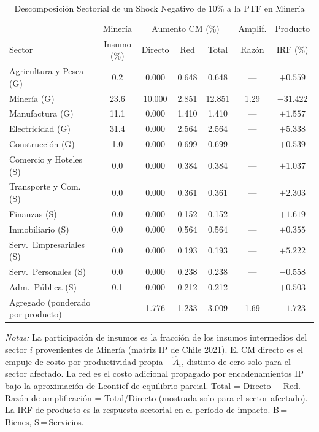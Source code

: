 \begin{table}[htbp]
\centering
\caption{Descomposición Sectorial de un Shock Negativo de 10\% a la PTF en Minería}
\label{tab:min_decomp}
\begin{threeparttable}
\small
\begin{tabular}{@{}l c c c c c c@{}}
\toprule
 & Minería & \multicolumn{3}{c}{Aumento CM (\%)} & Amplif. & Producto \\
\cmidrule(lr){3-5}
Sector & Insumo (\%) & Directo & Red & Total & Razón & IRF (\%) \\
\midrule
Agricultura y Pesca (G) &  0.2 & 0.000 & 0.648 & 0.648 & --- & $+0.559$ \\
Minería (G) & 23.6 & 10.000 & 2.851 & 12.851 &  1.29 & $-31.422$ \\
Manufactura (G) & 11.1 & 0.000 & 1.410 & 1.410 & --- & $+1.557$ \\
Electricidad (G) & 31.4 & 0.000 & 2.564 & 2.564 & --- & $+5.338$ \\
Construcción (G) &  1.0 & 0.000 & 0.699 & 0.699 & --- & $+0.539$ \\
Comercio y Hoteles (S) &  0.0 & 0.000 & 0.384 & 0.384 & --- & $+1.037$ \\
Transporte y Com. (S) &  0.0 & 0.000 & 0.361 & 0.361 & --- & $+2.303$ \\
Finanzas (S) &  0.0 & 0.000 & 0.152 & 0.152 & --- & $+1.619$ \\
Inmobiliario (S) &  0.0 & 0.000 & 0.564 & 0.564 & --- & $+0.355$ \\
Serv.\ Empresariales (S) &  0.0 & 0.000 & 0.193 & 0.193 & --- & $+5.222$ \\
Serv.\ Personales (S) &  0.0 & 0.000 & 0.238 & 0.238 & --- & $-0.558$ \\
Adm.\ Pública (S) &  0.1 & 0.000 & 0.212 & 0.212 & --- & $+0.503$ \\
\midrule
Agregado (ponderado por producto) & --- & 1.776 & 1.233 & 3.009 &  1.69 & $-1.723$ \\
\bottomrule
\end{tabular}
\begin{tablenotes}[flushleft]
\footnotesize
\item \textit{Notas:} La participación de insumos es la fracción de los insumos intermedios del sector $i$ provenientes de Minería (matriz IP de Chile 2021). El CM directo es el empuje de costo por productividad propia $-\hat A_i$, distinto de cero solo para el sector afectado. La red es el costo adicional propagado por encadenamientos IP bajo la aproximación de Leontief de equilibrio parcial. Total = Directo + Red. Razón de amplificación = Total/Directo (mostrada solo para el sector afectado). La IRF de producto es la respuesta sectorial en el período de impacto. B\,=\,Bienes, S\,=\,Servicios.
\end{tablenotes}
\end{threeparttable}
\end{table}
